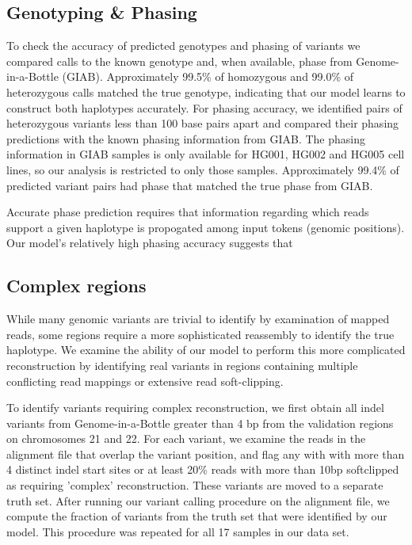 \documentclass[]{article}
\begin{document}
\subsection{Genotyping \& Phasing}

To check the accuracy of predicted genotypes and phasing of variants we compared calls to the known genotype and, when available, phase from Genome-in-a-Bottle (GIAB). Approximately 99.5\% of homozygous  and 99.0\% of heterozygous calls matched the true genotype, indicating that our model learns to construct both haplotypes accurately.  For phasing accuracy, we identified pairs of heterozygous variants less than 100 base pairs apart and compared their phasing predictions with the known phasing information from GIAB. The phasing information in GIAB samples is only available for HG001, HG002 and HG005 cell lines, so our analysis is restricted to only those samples. Approximately 99.4\% of predicted variant pairs had phase that matched the true phase from GIAB. 

Accurate phase prediction requires that information regarding which reads support a given haplotype is propogated among input tokens (genomic positions). Our model's relatively high phasing accuracy suggests that 


\subsection{Complex regions}
 While many genomic variants are trivial to identify by examination of mapped reads, some regions require a more sophisticated reassembly to identify the true haplotype. We examine the ability of our model to perform this more complicated reconstruction by identifying real variants in regions containing multiple conflicting read mappings or extensive read soft-clipping. 
 
 To identify variants requiring complex reconstruction, we first obtain all indel variants from Genome-in-a-Bottle greater than 4 bp from the validation regions on chromosomes 21 and 22. For each variant, we examine the reads in the alignment file that overlap the variant position, and flag any with with more than 4 distinct indel start sites or at least 20\% reads with more than 10bp softclipped as requiring 'complex' reconstruction. These variants are moved to a separate truth set. After running our variant calling procedure on the alignment file, we compute the fraction of variants from the truth set that were identified by our model. This procedure was repeated for all 17 samples in our data set. 
\end{document}
